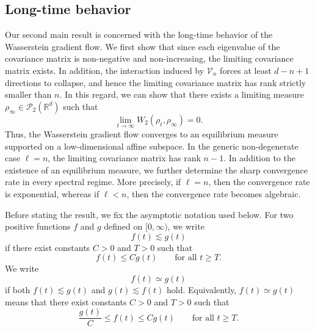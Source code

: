 \documentclass[11pt,reqno]{amsart}
\numberwithin{figure}{section}
\newcommand{\bbr}{\mathbb R}
\begin{document}
\subsection{Long-time behavior}

Our second main result is concerned with the long-time behavior of the Wasserstein gradient flow. We first show that since each eigenvalue of the covariance matrix is non-negative and non-increasing, the limiting covariance matrix exists. In addition, the interaction induced by $\mathcal V_n$ forces at least $d-n+1$ directions to collapse, and hence the limiting covariance matrix has rank strictly smaller than $n$.  In this regard, we can show that there exists a limiting measure $\rho_\infty \in \mathcal P_2(\bbr^d)$ such that
\[
\lim_{t\to\infty} W_2(\rho_t,\rho_\infty) =0.
\]
Thus, the Wasserstein gradient flow converges to an equilibrium measure supported on a low-dimensional affine subspace. In the generic non-degenerate case $\ell=n$, the limiting covariance matrix has rank $n-1$. In addition to the existence of an equilibrium measure, we further determine the sharp convergence rate in every spectral regime. More precisely, if $\ell=n$, then the convergence rate is exponential, whereas if $\ell<n$, then the convergence rate becomes algebraic. 

Before stating the result, we fix the asymptotic notation used below. 
For two positive functions \(f\) and \(g\) defined on \([0,\infty)\), we write
\[
f(t)\lesssim g(t)
\]
if there exist constants \(C>0\) and \(T>0\) such that
\[
f(t)\le Cg(t) \qquad \text{for all } t\ge T.
\]
We write
\[
f(t)\simeq g(t)
\]
if both \(f(t)\lesssim g(t)\) and \(g(t)\lesssim f(t)\) hold. Equivalently, 
\(f(t)\simeq g(t)\) means that there exist constants \(C>0\) and \(T>0\) such that
\[
\frac{g(t)}{C}\le f(t)\le C g(t)
\qquad \text{for all } t\ge T.
\]
\end{document}
